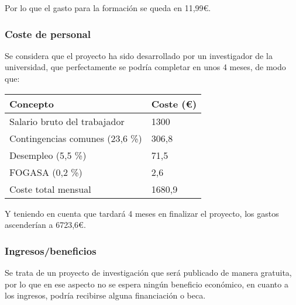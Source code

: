 Por lo que el gasto para la formación se queda en 11,99\euro.

\subsubsection{Coste de personal}

Se considera que el proyecto ha sido desarrollado por un investigador de la universidad, que perfectamente se podría completar en unos 4 meses, de modo que:
\begin{table}[H]
	\begin{center}
		\begin{tabular}{ll}
			\hline
			Concepto                        & Coste (\euro) \\ \hline
			Salario bruto del trabajador    & 1300      \\
			Contingencias comunes (23,6 \%) & 306,8     \\
			Desempleo (5,5 \%)              & 71,5        \\
			FOGASA (0,2 \%)                 & 2,6       \\\hline
			Coste total mensual             & 1680,9  
		\end{tabular}
	\end{center}
\end{table}

Y teniendo en cuenta que tardará 4 meses en finalizar el proyecto, los gastos ascenderían a 6723,6\euro.
\subsubsection{Ingresos/beneficios}
Se trata de un proyecto de investigación que será publicado de manera gratuita, por lo que en ese aspecto no se espera ningún beneficio económico, en cuanto a los ingresos, podría recibirse alguna financiación o beca.

